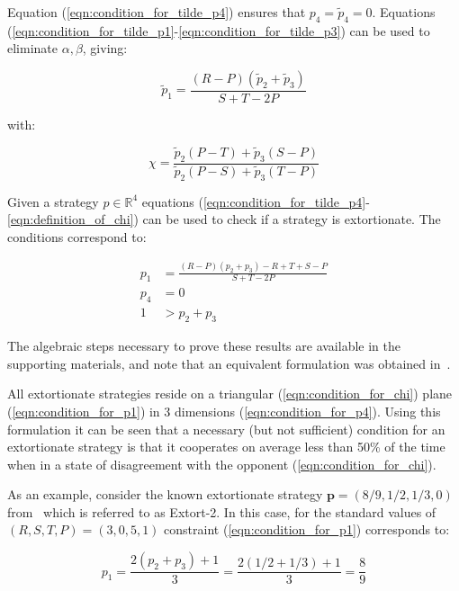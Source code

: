 \documentclass[a4paper]{article}
\begin{document}
Equation (\ref{eqn:condition_for_tilde_p4}) ensures that \(p_4=\tilde p_4=0\).
Equations (\ref{eqn:condition_for_tilde_p1}-\ref{eqn:condition_for_tilde_p3})
can be used to eliminate \(\alpha, \beta\), giving:

\begin{equation}\label{eqn:planar_definition_of_extortion}
    \tilde p_1 = \frac{(R - P)(\tilde p_2 + \tilde p_3)}{S + T - 2P}
\end{equation}

with:

\begin{equation}\label{eqn:definition_of_chi}
    \chi = \frac{\tilde p_2 (P - T) + \tilde p_3 (S - P)}
                {\tilde p_2 (P - S) + \tilde p_3 (T - P)}
\end{equation}

Given a strategy \(p\in\mathbb{R}^{4}\) equations
(\ref{eqn:condition_for_tilde_p4}-\ref{eqn:definition_of_chi}) can be used to
check if a strategy is extortionate. The conditions correspond to:

\begin{align}
    p_1 & = \frac{(R-P)(p_2 + p_3) - R + T + S - P}{S + T - 2P}
     \label{eqn:condition_for_p1}\\
    p_4 & = 0 \label{eqn:condition_for_p4}\\
    1 & > p_2 + p_3\label{eqn:condition_for_chi}
\end{align}

The algebraic steps necessary to prove these results are available in the
supporting materials, and note that an equivalent formulation was obtained
in~\cite{adami2013evolutionary}.

All extortionate strategies reside on a triangular (\ref{eqn:condition_for_chi})
plane (\ref{eqn:condition_for_p1}) in 3 dimensions (\ref{eqn:condition_for_p4}).
Using this formulation it can be seen that a necessary (but not sufficient)
condition for an extortionate strategy is that it cooperates on average less
than 50\% of the time when in a state of disagreement with the opponent
(\ref{eqn:condition_for_chi}).

As an example, consider the known extortionate strategy \(\textbf{p}=(8 / 9, 1 / 2, 1 /
3, 0)\) from~\cite{Stewart2012} which is referred to as Extort-2. In
this case, for the standard values of \((R, S, T, P) = (3, 0, 5, 1)\)
constraint (\ref{eqn:condition_for_p1}) corresponds to:

\begin{equation}
    p_1 = \frac{2(p_2 + p_3) + 1}{3}
        = \frac{2(1 / 2 + 1 / 3) + 1}{3}
        = \frac{8}{9}
\end{equation}
\end{document}
